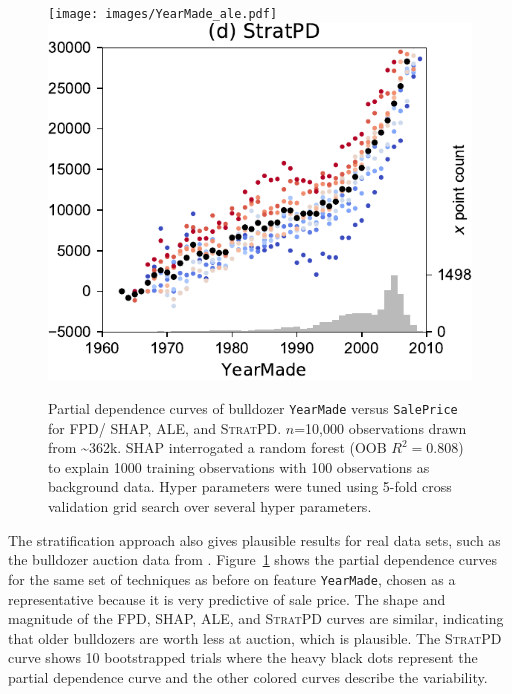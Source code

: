 \documentclass[smallextended]{svjour3}       %
\newcommand{\figref}[1]{Figure~\ref{#1}}
\newcommand{\spd}{\fontfamily{cmr}\textsc{\small StratPD}}
\begin{document}
\begin{figure}[!htbp]
\begin{center}
\texttt{[image: images/YearMade\_ale.pdf]}~~
\includegraphics[scale=0.29]{images/bulldozer_YearMade_stratpd.pdf}\vspace{-2mm}
\caption{\small Partial dependence curves of bulldozer {\tt YearMade} versus {\tt SalePrice} for FPD/ SHAP, ALE, and \spd. $n$=10,000 observations drawn from \textasciitilde{}362k. SHAP interrogated a random forest (OOB $R^2=0.808$) to explain 1000 training observations with 100 observations as background data. Hyper parameters were tuned using 5-fold cross validation grid search over several hyper parameters.}
\label{fig:yearmade}
\end{center}
\end{figure}


The stratification approach also gives plausible results for real data sets, such as the bulldozer auction data from \citet{bulldozer}. \figref{fig:yearmade} shows the partial dependence curves for the same set of techniques as before on feature {\tt\small YearMade}, chosen as a representative because it is very predictive of sale price. The shape and magnitude of the FPD, SHAP, ALE, and \spd{} curves are similar, indicating that older bulldozers are worth less at auction, which is plausible. The \spd{} curve shows 10 bootstrapped trials where the heavy black dots represent the partial dependence curve and the other colored curves describe the variability. 
\end{document}
